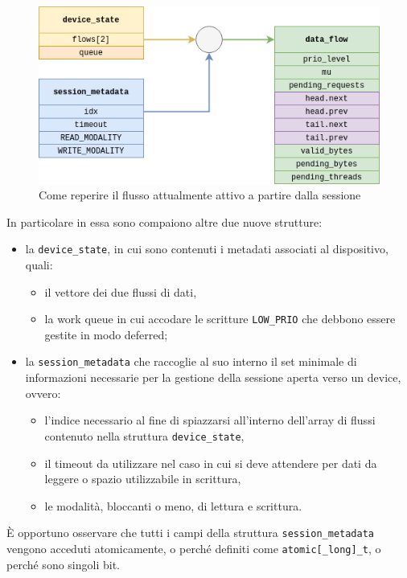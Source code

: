 \documentclass{article}
\begin{document}
\begin{figure}[htbp]
        \centering
        \includegraphics[width=.8\textwidth]{get_active_flow}
        \caption{Come reperire il flusso attualmente attivo a partire dalla sessione}
        \label{fig:get_active_flow}
\end{figure}

In particolare in essa sono compaiono altre due nuove strutture:
\begin{itemize}
        \item la \texttt{device\_state}, in cui sono contenuti i metadati associati al dispositivo, quali:
                \begin{itemize}
                        \item il vettore dei due flussi di dati,
                        \item la work queue in cui accodare le scritture \texttt{LOW\_PRIO} che debbono essere gestite in modo deferred;
                \end{itemize}
        \item la \texttt{session\_metadata} che raccoglie al suo interno il set minimale di informazioni necessarie per la gestione della sessione aperta verso un device, ovvero:
                \begin{itemize}
                        \item l'indice necessario al fine di spiazzarsi all'interno dell'array di flussi contenuto nella struttura \texttt{device\_state},
                        \item il timeout da utilizzare nel caso in cui si deve attendere per dati da leggere o spazio utilizzabile in scrittura,
                        \item le modalità, bloccanti o meno, di lettura e scrittura.
                \end{itemize}
\end{itemize}

È opportuno osservare che tutti i campi della struttura \texttt{session\_metadata} vengono acceduti atomicamente, o perché definiti come \texttt{atomic[\_long]\_t}, o perché sono singoli bit.
\end{document}
